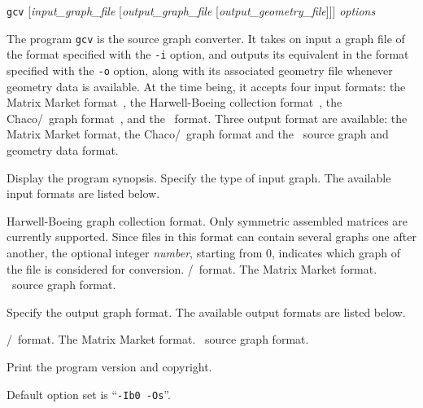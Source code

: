 \begin{itemize}
\progsyn
\texttt{gcv} [{\it input\_graph\_file} [{\it output\_graph\_file} [{\it output\_geometry\_file}]]] {\it options}

\progdes
The program \texttt{gcv} is the source graph converter. It takes on input a graph
file of the format specified with the \texttt{-i} option, and outputs its
equivalent in the format specified with the \texttt{-o} option, along with its
associated geometry file whenever geometry data is available.
At the time being, it accepts four input formats: the Matrix Market
format~\cite{bopore96}, the Harwell-Boeing collection
format~\cite{dugrle92}, the {\sc Chaco}/\metis\ graph
format~\cite{hele93c}, and the \scotch\ format.  Three output format
are available: the Matrix Market format, the {\sc Chaco}/\metis\ graph
format and the \scotch\ source graph and geometry data format.
\progopt
\begin{itemize}
\iteme[\texttt{-h}]
Display the program synopsis.
Specify the type of input graph.
The available input formats are listed below.
\begin{itemize}
\iteme[{\texttt{b}[{\it number}]}]
Harwell-Boeing graph collection format. Only symmetric assembled matrices
are currently supported.
Since files in this format can contain several graphs one after another,
the optional integer {\it number}, starting
from $0$, indicates which graph of the file is considered for conversion.
/\metis\ format.
\iteme[\texttt{m}]
The Matrix Market format.
\iteme[\texttt{s}]
\scotch\ source graph format.
\end{itemize}
Specify the output graph format. The available output formats are listed below.
\begin{itemize}
/\metis\ format.
\iteme[\texttt{m}]
The Matrix Market format.
\iteme[\texttt{s}]
\scotch\ source graph format.
\end{itemize}
\iteme[\texttt{-V}]
Print the program version and copyright.
\end{itemize}

Default option set is ``\texttt{-Ib0 -Os}''.
\end{itemize}

